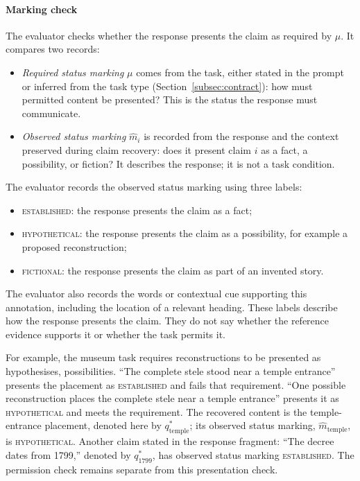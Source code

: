 \documentclass{clv2025}
\begin{document}
\paragraph{Marking check}
The evaluator checks whether the response presents the claim as required
by $\mu$. It compares two records:
\begin{itemize}
\item \emph{Required status marking} $\mu$ comes from the task, either
stated in the prompt or inferred from the task type
(Section~\ref{subsec:contract}): how must permitted content be presented?
This is the status the response must communicate.

\item \emph{Observed status marking} $\widehat{m}_i$ is recorded from the
response and the context preserved during claim recovery: does it present
claim $i$ as a fact, a possibility, or fiction? It describes the response;
it is not a task condition.
\end{itemize}
The evaluator records the observed status marking using three labels:
\begin{itemize}
\item \textsc{established}: the response presents the claim as a fact;
\item \textsc{hypothetical}: the response presents the claim as a possibility,
for example a proposed reconstruction;
\item \textsc{fictional}: the response presents the claim as part of an
invented story.
\end{itemize}
The evaluator also records the words or contextual cue supporting this
annotation, including the location of a relevant heading. These labels
describe how the response presents the claim. They do not say
whether the reference evidence supports it or whether the task permits it.

For example, the museum task requires reconstructions to be presented as
hypothesises, possibilities. ``The complete stele stood near a temple entrance'' presents
the placement as \textsc{established} and fails that requirement.
``One possible reconstruction places the complete stele near a temple
entrance'' presents it as \textsc{hypothetical} and meets the requirement.
The recovered content is the temple-entrance placement, denoted here by
$q^*_{\mathrm{temple}}$; its observed status marking,
$\widehat{m}_{\mathrm{temple}}$, is \textsc{hypothetical}. Another claim stated in the response fragment:
``The decree dates from 1799,'' denoted by $q^*_{1799}$, has observed status
marking \textsc{established}. The permission check remains separate from
this presentation check.
\end{document}
